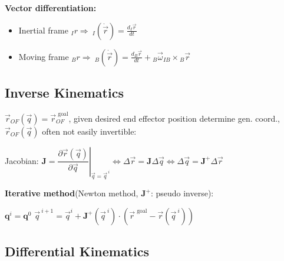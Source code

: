 \documentclass[fontsize=6pt]{scrartcl}
\newcommand{\mat}[1]{\mathbf{#1}}
\begin{document}
\begin{multicols*}{4}
\textbf{Vector differentiation:}
\begin{itemize}
	\item Inertial frame ${}_I r \Rightarrow ~_I(\dot{\vec{r}}) = \frac{d {}_I \vec{r}}{dt}$
	\item Moving frame ${}_Br \Rightarrow ~_B(\dot{\vec{r}}) = \frac{d {}_B \vec{r}}{dt} +
		{}_B\vec\omega_{IB} \times {}_B\vec{r}$
\end{itemize}

\subsection*{Inverse Kinematics}

$\vec{r}_{OF}(\vec{q}) = \vec{r}_{OF}^{\text{ goal}}$, given desired end effector position determine gen. coord., $\vec{r}_{OF}(\vec{q})$ often not easily invertible:

Jacobian: $\mat J = \left. \dfrac{\partial \vec{r}(\vec q)}{\partial \vec q}\right\rvert_{\vec{q}=
\vec{q}^{\:i}} \Leftrightarrow \Delta\vec{r} = \mat{J}\Delta\vec{q} \Leftrightarrow
\Delta\vec{q}=\mat J^+ \Delta\vec{r}$

\textbf{Iterative method}(Newton method, $\mat J^+$: pseudo inverse):

\begin{algorithm}[H]
	\DontPrintSemicolon
	$\mathbf q^i = \mathbf q^0$\;
	{
		$\vec q^{\:i+1} = \vec q^i + \mat J^+(\vec q^{\:i}) \cdot (\vec r^\text{ goal}
		- \vec r(\vec q^{\:i}))$
	}
\end{algorithm}


\subsection*{Differential Kinematics}


\end{multicols*}
\end{document}
